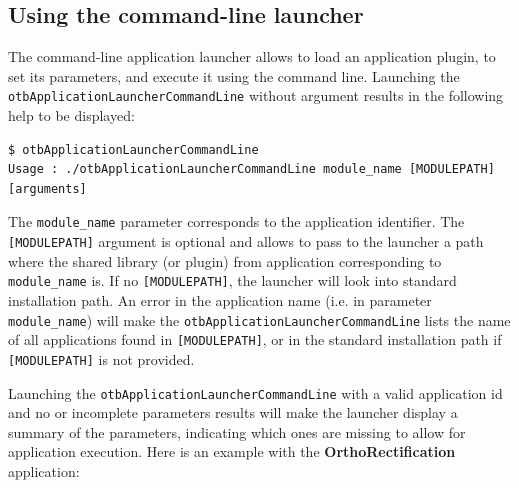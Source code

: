 \subsection{Using the command-line launcher}

The command-line application launcher allows to load an application
plugin, to set its parameters, and execute it using the command
line. Launching the \verb?otbApplicationLauncherCommandLine?
without argument results in the following help to be displayed:

\begin{verbatim}
$ otbApplicationLauncherCommandLine 
Usage : ./otbApplicationLauncherCommandLine module_name [MODULEPATH] [arguments]
\end{verbatim} 

The \verb?module_name? parameter corresponds to the application
identifier. The \verb?[MODULEPATH]? argument is optional and allows 
to pass to the launcher a path where the shared library (or plugin) from
application corresponding to \verb?module_name? is. If no
\verb?[MODULEPATH]?, the launcher will look into standard \otb
installation path. An error in the application name (i.e. in parameter
\verb?module_name?) will make the
\verb?otbApplicationLauncherCommandLine? lists the name of all
applications found in \verb?[MODULEPATH]?, or in the standard \otb
installation path if \verb?[MODULEPATH]? is not provided.

Launching the \verb?otbApplicationLauncherCommandLine? with a valid
application id and no or incomplete parameters results will make the
launcher display a summary of the parameters, indicating which ones
are missing to allow for application execution. Here is an example
with the \textbf{OrthoRectification} application:

